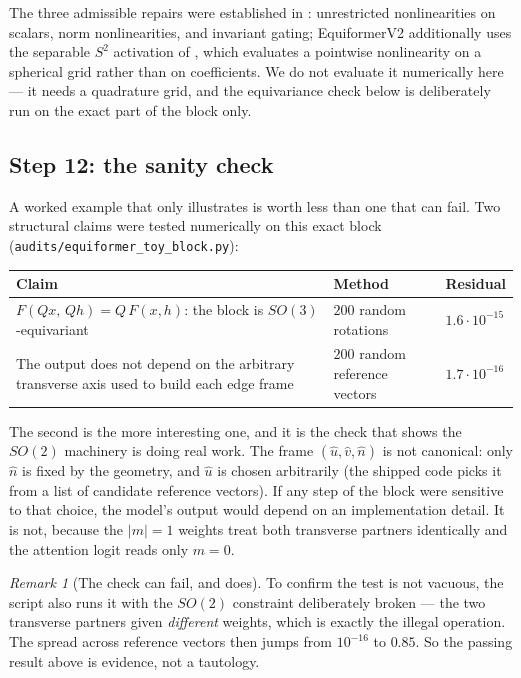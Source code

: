 \documentclass[11pt,a4paper]{report}
\theoremstyle{definition}
\theoremstyle{remark}
\newtheorem{remark}[remark]{Remark}
\newcommand{\file}[1]{\texttt{#1}}
\begin{document}
The three admissible repairs were established in
: unrestricted nonlinearities on scalars, norm
nonlinearities, and invariant gating; EquiformerV2 additionally uses the
separable $S^2$ activation of , which
evaluates a pointwise nonlinearity on a spherical grid rather than on
coefficients. We do not evaluate it numerically here --- it needs a
quadrature grid, and the equivariance check below is deliberately run on
the exact part of the block only.

\subsection{Step 12: the sanity check}
\label{sec:toy-equivariance-check}

A worked example that only illustrates is worth less than one that can
fail. Two structural claims were tested numerically on this exact block
(\file{audits/equiformer\_toy\_block.py}):

\begin{center}
\begin{tabular}{p{6.6cm}p{3.2cm}l}
\toprule
Claim & Method & Residual \\
\midrule
$F(Qx,\,Qh)=Q\,F(x,h)$: the block is $SO(3)$-equivariant
& $200$ random rotations
& $1.6\cdot10^{-15}$ \\
The output does not depend on the arbitrary transverse axis used to build
each edge frame
& $200$ random reference vectors
& $1.7\cdot10^{-16}$ \\
\bottomrule
\end{tabular}
\end{center}

The second is the more interesting one, and it is the check that shows the
$SO(2)$ machinery is doing real work. The frame $(\hat u,\hat v,\hat n)$ is
not canonical: only $\hat n$ is fixed by the geometry, and $\hat u$ is
chosen arbitrarily (the shipped code picks it from a list of candidate
reference vectors). If any step of the block were sensitive to that choice,
the model's output would depend on an implementation detail. It is not,
because the $|m|=1$ weights treat both transverse partners identically and
the attention logit reads only $m=0$.

\begin{remark}[The check can fail, and does]
\label{rem:toy-counter-test}
To confirm the test is not vacuous, the script also runs it with the
$SO(2)$ constraint deliberately broken --- the two transverse partners given
\emph{different} weights, which is exactly the illegal operation. The spread
across reference vectors then jumps from $10^{-16}$ to $\mathbf{0.85}$. So
the passing result above is evidence, not a tautology.
\end{remark}
\end{document}

